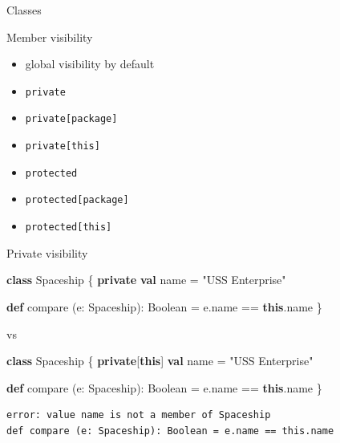 \documentclass[ignorenonframetext,]{beamer}
\newenvironment{Shaded}{\begin{snugshade}}{\end{snugshade}}
\newcommand{\KeywordTok}[1]{\textcolor[rgb]{0.13,0.29,0.53}{\textbf{#1}}}
\newcommand{\StringTok}[1]{\textcolor[rgb]{0.31,0.60,0.02}{#1}}
\newcommand{\FunctionTok}[1]{\textcolor[rgb]{0.00,0.00,0.00}{#1}}
\newcommand{\NormalTok}[1]{#1}
\providecommand{\tightlist}{%
  \setlength{\itemsep}{0pt}\setlength{\parskip}{0pt}}
\begin{document}
\begin{frame}[fragile]
\begin{block}{Classes}
\end{block}

\begin{block}{Member visibility}

\begin{itemize}
\tightlist
\item
  global visibility by default
\item
  \texttt{private}
\item
  \texttt{private{[}package{]}}
\item
  \texttt{private{[}this{]}}
\item
  \texttt{protected}
\item
  \texttt{protected{[}package{]}}
\item
  \texttt{protected{[}this{]}}
\end{itemize}

\end{block}

\begin{block}{Private visibility}

\begin{Shaded}
\begin{Highlighting}[]
\KeywordTok{class}\NormalTok{ Spaceship \{}
  \KeywordTok{private} \KeywordTok{val}\NormalTok{ name = }\StringTok{"USS Enterprise"}

  \KeywordTok{def} \FunctionTok{compare}\NormalTok{ (e: Spaceship): Boolean = e.}\FunctionTok{name}\NormalTok{ == }\KeywordTok{this}\NormalTok{.}\FunctionTok{name}
\NormalTok{\}}
\end{Highlighting}
\end{Shaded}

vs

\begin{Shaded}
\begin{Highlighting}[]
\KeywordTok{class}\NormalTok{ Spaceship \{}
  \KeywordTok{private}\NormalTok{[}\KeywordTok{this}\NormalTok{] }\KeywordTok{val}\NormalTok{ name = }\StringTok{"USS Enterprise"}

  \KeywordTok{def} \FunctionTok{compare}\NormalTok{ (e: Spaceship): Boolean = e.}\FunctionTok{name}\NormalTok{ == }\KeywordTok{this}\NormalTok{.}\FunctionTok{name}
\NormalTok{\}}
\end{Highlighting}
\end{Shaded}

\begin{verbatim}
error: value name is not a member of Spaceship
def compare (e: Spaceship): Boolean = e.name == this.name
\end{verbatim}


\end{block}
\end{frame}
\end{document}
